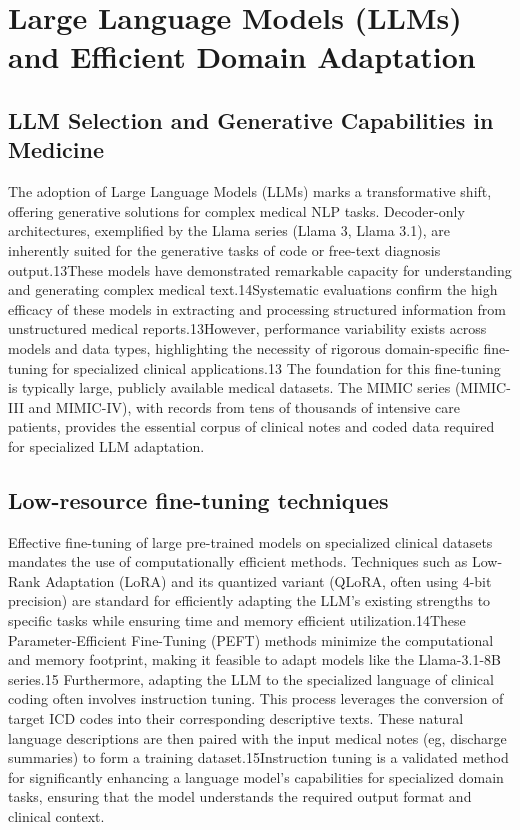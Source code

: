 \section{Large Language Models (LLMs) and Efficient Domain Adaptation}
\subsection{LLM Selection and Generative Capabilities in Medicine}
The adoption of Large Language Models (LLMs) marks a transformative shift, offering generative solutions for complex medical NLP tasks. Decoder-only architectures, exemplified by the Llama series (Llama 3, Llama 3.1), are inherently suited for the generative tasks of code or free-text diagnosis output.13These models have demonstrated remarkable capacity for understanding and generating complex medical text.14Systematic evaluations confirm the high efficacy of these models in extracting and processing structured information from unstructured medical reports.13However, performance variability exists across models and data types, highlighting the necessity of rigorous domain-specific fine-tuning for specialized clinical applications.13
The foundation for this fine-tuning is typically large, publicly available medical datasets. The MIMIC series (MIMIC-III and MIMIC-IV), with records from tens of thousands of intensive care patients, provides the essential corpus of clinical notes and coded data required for specialized LLM adaptation.

\subsection{Low-resource fine-tuning techniques}
Effective fine-tuning of large pre-trained models on specialized clinical datasets mandates the use of computationally efficient methods. Techniques such as Low-Rank Adaptation (LoRA) and its quantized variant (QLoRA, often using 4-bit precision) are standard for efficiently adapting the LLM's existing strengths to specific tasks while ensuring time and memory efficient utilization.14These Parameter-Efficient Fine-Tuning (PEFT) methods minimize the computational and memory footprint, making it feasible to adapt models like the Llama-3.1-8B series.15
Furthermore, adapting the LLM to the specialized language of clinical coding often involves instruction tuning. This process leverages the conversion of target ICD codes into their corresponding descriptive texts. These natural language descriptions are then paired with the input medical notes (eg, discharge summaries) to form a training dataset.15Instruction tuning is a validated method for significantly enhancing a language model's capabilities for specialized domain tasks, ensuring that the model understands the required output format and clinical context.

